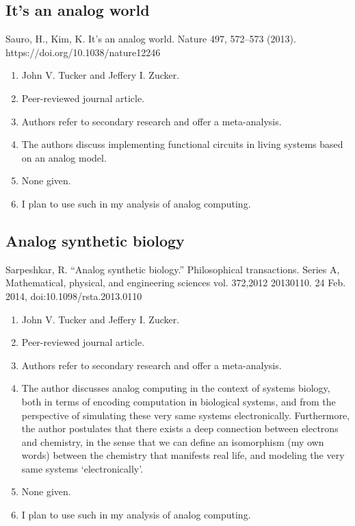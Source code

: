 \subsection*{It’s an analog world}
Sauro, H., Kim, K. It's an analog world. Nature 497, 572–573 (2013). https://doi.org/10.1038/nature12246
\begin{enumerate}
    \item John V. Tucker and Jeffery I. Zucker.
    \item Peer-reviewed journal article.
    \item Authors refer to secondary research and offer a meta-analysis.
    \item The authors discuss implementing functional circuits in living systems based on an analog model.
    \item None given. 
    \item I plan to use such in my analysis of analog computing. 
\end{enumerate}


\subsection*{Analog synthetic biology}
Sarpeshkar, R. “Analog synthetic biology.” Philosophical transactions. Series A, Mathematical, physical, and engineering sciences vol. 372,2012 20130110. 24 Feb. 2014, doi:10.1098/rsta.2013.0110
\begin{enumerate}
    \item John V. Tucker and Jeffery I. Zucker.
    \item Peer-reviewed journal article.
    \item Authors refer to secondary research and offer a meta-analysis.
    \item The author discusses analog computing in the context of systems biology, both in terms of encoding computation in biological systems, and from the perspective of simulating these very same systems electronically. Furthermore, the author postulates that there exists a deep connection between electrons and chemistry, in the sense that we can define an isomorphism (my own words) between the chemistry that manifests real life, and modeling the very same systems `electronically'.  
    \item None given. 
    \item I plan to use such in my analysis of analog computing. 
\end{enumerate}


